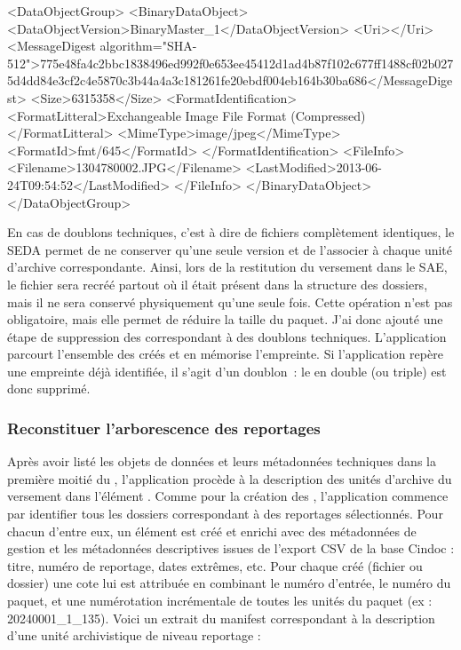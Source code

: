 \begin{xml}
<DataObjectGroup>
	<BinaryDataObject>
		<DataObjectVersion>BinaryMaster_1</DataObjectVersion>
		<Uri></Uri>
		<MessageDigest algorithm="SHA-512">775e48fa4c2bbc1838496ed992f0e653ee45412d1ad4b87f102c677ff1488cf02b0275d4dd84e3cf2c4e5870c3b44a4a3c181261fe20ebdf004eb164b30ba686</MessageDigest>
		<Size>6315358</Size>
		<FormatIdentification>
			<FormatLitteral>Exchangeable Image File Format (Compressed)</FormatLitteral>
			<MimeType>image/jpeg</MimeType>
			<FormatId>fmt/645</FormatId>
		</FormatIdentification>
		<FileInfo>
			<Filename>1304780002.JPG</Filename>
			<LastModified>2013-06-24T09:54:52</LastModified>
		</FileInfo>
	</BinaryDataObject>
</DataObjectGroup>
\end{xml}

En cas de doublons techniques, c'est à dire de fichiers complètement identiques, le SEDA permet de ne conserver qu’une seule version et de l’associer à chaque unité d'archive correspondante. Ainsi, lors de la restitution du versement dans le SAE, le fichier sera recréé partout où il était présent dans la structure des dossiers, mais il ne sera conservé physiquement qu’une seule fois. Cette opération n'est pas obligatoire, mais elle permet de réduire la taille du paquet. J'ai donc ajouté une étape de suppression des  correspondant à des doublons techniques. L'application parcourt l’ensemble des  créés et en mémorise l’empreinte. Si l’application repère une empreinte déjà identifiée, il s’agit d’un doublon : le  en double (ou triple) est donc supprimé.

\subsubsection*{Reconstituer l'arborescence des reportages}

Après avoir listé les objets de données et leurs métadonnées techniques dans la première moitié du , l'application procède à la description des unités d'archive du versement dans l'élément . Comme pour la création des , l'application commence par identifier tous les dossiers correspondant à des reportages sélectionnés. Pour chacun d'entre eux, un élément  est créé et enrichi avec des métadonnées de gestion et les métadonnées descriptives issues de l'export CSV de la base Cindoc : titre, numéro de reportage, dates extrêmes, etc.
Pour chaque  créé (fichier ou dossier) une cote lui est attribuée en combinant le numéro d'entrée, le numéro du paquet, et une numérotation incrémentale de toutes les unités du paquet (ex : 20240001\_1\_135). Voici un extrait du manifest correspondant à la description d'une unité archivistique de niveau reportage : 

